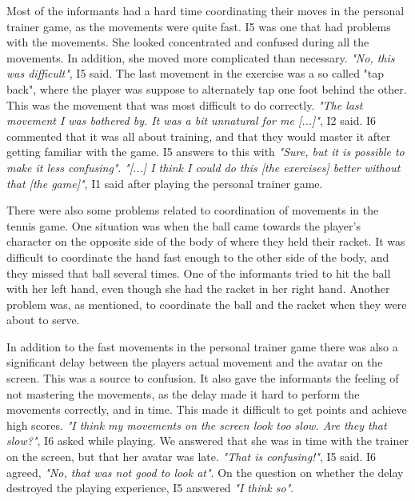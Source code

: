 Most of the informants had a hard time coordinating their moves in the personal trainer game, as the movements were quite fast. I5 was one that had problems with the movements. She looked concentrated and confused during all the movements. In addition, she moved more complicated than necessary. \emph{"No, this was difficult"}, I5 said. The last movement in the exercise was a so called "tap back", where the player was suppose to alternately tap one foot behind the other. This was the movement that was most difficult to do correctly. \emph{"The last movement I was bothered by. It was a bit unnatural for me [...]"}, I2 said. I6 commented that it was all about training, and that they would master it after getting familiar with the game. I5 answers to this with \emph{"Sure, but it is possible to make it less confusing"}. \emph{"[...] I think I could do this [the exercises] better without that [the game]"}, I1 said after playing the personal trainer game. 

There were also some problems related to coordination of movements in the tennis game. One situation was when the ball came towards the player's character on the opposite side of the body of where they held their racket. It was difficult to coordinate the hand fast enough to the other side of the body, and they missed that ball several times. One of the informants tried to hit the ball with her left hand, even though she had the racket in her right hand. Another problem was, as mentioned, to coordinate the ball and the racket when they were about to serve. 

In addition to the fast movements in the personal trainer game there was also a significant delay between the players actual movement and the avatar on the screen. This was a source to confusion. It also gave the informants the feeling of not mastering the movements, as the delay made it hard to perform the movements correctly, and in time. This made it difficult to get points and achieve high scores. \emph{"I think my movements on the screen look too slow. Are they that slow?"}, I6 asked while playing. We answered that she was in time with the trainer on the screen, but that her avatar was late. \emph{"That is confusing!"}, I5 said. I6 agreed, \emph{"No, that was not good to look at"}. On the question on whether the delay destroyed the playing experience, I5 answered \emph{"I think so"}.

